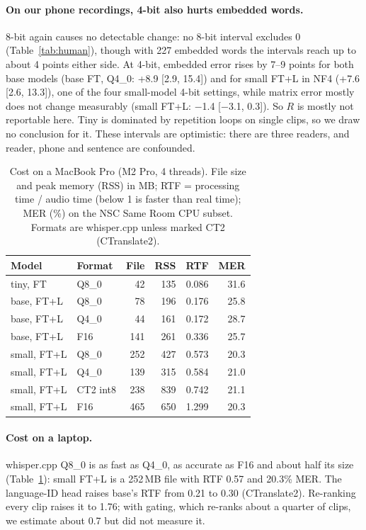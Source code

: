 \paragraph{On our phone recordings, 4-bit also hurts embedded words.}
8-bit again causes no detectable change: no 8-bit interval excludes 0 (Table~\ref{tab:human}), though with 227 embedded words the intervals reach up to about 4 points either side. At 4-bit, embedded error rises by 7--9 points for both base models (base FT, Q4\_0: +8.9 [2.9, 15.4]) and for small FT+L in NF4 (+7.6 [2.6, 13.3]), one of the four small-model 4-bit settings, while matrix error mostly does not change measurably (small FT+L: $-$1.4 [$-$3.1, 0.3]). So $R$ is mostly not reportable here. Tiny is dominated by repetition loops on single clips, so we draw no conclusion for it. These intervals are optimistic: there are three readers, and reader, phone and sentence are confounded.

\begin{table}[t]
\centering
\small
\setlength{\tabcolsep}{3.5pt}
\begin{tabular}{llrrrr}
\toprule
Model & Format & File & RSS & RTF & MER \\
\midrule
tiny, FT & Q8\_0 & 42 & 135 & 0.086 & 31.6 \\
base, FT+L & Q8\_0 & 78 & 196 & 0.176 & 25.8 \\
base, FT+L & Q4\_0 & 44 & 161 & 0.172 & 28.7 \\
base, FT+L & F16 & 141 & 261 & 0.336 & 25.7 \\
small, FT+L & Q8\_0 & 252 & 427 & 0.573 & 20.3 \\
small, FT+L & Q4\_0 & 139 & 315 & 0.584 & 21.0 \\
small, FT+L & CT2 int8 & 238 & 839 & 0.742 & 21.1 \\
small, FT+L & F16 & 465 & 650 & 1.299 & 20.3 \\
\bottomrule
\end{tabular}
\caption{Cost on a MacBook Pro (M2 Pro, 4 threads). File size and peak memory (RSS) in MB; RTF = processing time / audio time (below 1 is faster than real time); MER (\%) on the NSC Same Room CPU subset. Formats are whisper.cpp unless marked CT2 (CTranslate2).}
\label{tab:speed}
\end{table}

\paragraph{Cost on a laptop.}
whisper.cpp Q8\_0 is as fast as Q4\_0, as accurate as F16 and about half its size (Table~\ref{tab:speed}): small FT+L is a 252\,MB file with RTF 0.57 and 20.3\% MER. The language-ID head raises base's RTF from 0.21 to 0.30 (CTranslate2). Re-ranking every clip raises it to 1.76; with gating, which re-ranks about a quarter of clips, we estimate about 0.7 but did not measure it.
